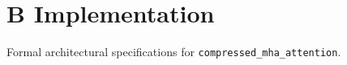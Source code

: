 \section{B Implementation}

Formal architectural specifications for \texttt{compressed_mha_attention}.
